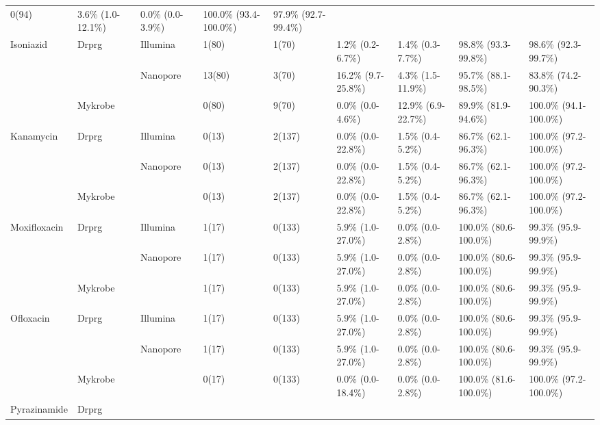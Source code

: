 \begin{table}
{\begin{tabular}{lllllllll}
  0(94) &
  3.6\% (1.0-12.1\%) &
  0.0\% (0.0-3.9\%) &
  100.0\% (93.4-100.0\%) &
  97.9\% (92.7-99.4\%) \\
\multirow{3}{*}{Isoniazid} &
  \multirow{2}{*}{Drprg} &
  Illumina &
  1(80) &
  1(70) &
  1.2\% (0.2-6.7\%) &
  1.4\% (0.3-7.7\%) &
  98.8\% (93.3-99.8\%) &
  98.6\% (92.3-99.7\%) \\
 &
   &
  \multirow{2}{*}{Nanopore} &
  13(80) &
  3(70) &
  16.2\% (9.7-25.8\%) &
  4.3\% (1.5-11.9\%) &
  95.7\% (88.1-98.5\%) &
  83.8\% (74.2-90.3\%) \\
 &
  Mykrobe &
   &
  0(80) &
  9(70) &
  0.0\% (0.0-4.6\%) &
  12.9\% (6.9-22.7\%) &
  89.9\% (81.9-94.6\%) &
  100.0\% (94.1-100.0\%) \\
\multirow{3}{*}{Kanamycin} &
  \multirow{2}{*}{Drprg} &
  Illumina &
  0(13) &
  2(137) &
  0.0\% (0.0-22.8\%) &
  1.5\% (0.4-5.2\%) &
  86.7\% (62.1-96.3\%) &
  100.0\% (97.2-100.0\%) \\
 &
   &
  \multirow{2}{*}{Nanopore} &
  0(13) &
  2(137) &
  0.0\% (0.0-22.8\%) &
  1.5\% (0.4-5.2\%) &
  86.7\% (62.1-96.3\%) &
  100.0\% (97.2-100.0\%) \\
 &
  Mykrobe &
   &
  0(13) &
  2(137) &
  0.0\% (0.0-22.8\%) &
  1.5\% (0.4-5.2\%) &
  86.7\% (62.1-96.3\%) &
  100.0\% (97.2-100.0\%) \\
\multirow{3}{*}{Moxifloxacin} &
  \multirow{2}{*}{Drprg} &
  Illumina &
  1(17) &
  0(133) &
  5.9\% (1.0-27.0\%) &
  0.0\% (0.0-2.8\%) &
  100.0\% (80.6-100.0\%) &
  99.3\% (95.9-99.9\%) \\
 &
   &
  \multirow{2}{*}{Nanopore} &
  1(17) &
  0(133) &
  5.9\% (1.0-27.0\%) &
  0.0\% (0.0-2.8\%) &
  100.0\% (80.6-100.0\%) &
  99.3\% (95.9-99.9\%) \\
 &
  Mykrobe &
   &
  1(17) &
  0(133) &
  5.9\% (1.0-27.0\%) &
  0.0\% (0.0-2.8\%) &
  100.0\% (80.6-100.0\%) &
  99.3\% (95.9-99.9\%) \\
\multirow{3}{*}{Ofloxacin} &
  \multirow{2}{*}{Drprg} &
  Illumina &
  1(17) &
  0(133) &
  5.9\% (1.0-27.0\%) &
  0.0\% (0.0-2.8\%) &
  100.0\% (80.6-100.0\%) &
  99.3\% (95.9-99.9\%) \\
 &
   &
  \multirow{2}{*}{Nanopore} &
  1(17) &
  0(133) &
  5.9\% (1.0-27.0\%) &
  0.0\% (0.0-2.8\%) &
  100.0\% (80.6-100.0\%) &
  99.3\% (95.9-99.9\%) \\
 &
  Mykrobe &
   &
  0(17) &
  0(133) &
  0.0\% (0.0-18.4\%) &
  0.0\% (0.0-2.8\%) &
  100.0\% (81.6-100.0\%) &
  100.0\% (97.2-100.0\%) \\
\multirow{3}{*}{Pyrazinamide} &
  \multirow{2}{*}{Drprg} &

\end{tabular}}
\end{table}
